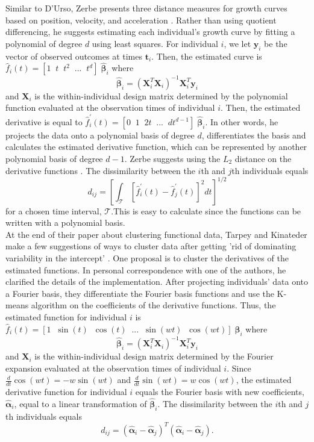 \documentclass[12pt]{article}
\newcommand{\B}[0]{\mathbf}
\newcommand{\bs}[0]{\boldsymbol}
\begin{document}
Similar to D'Urso, Zerbe presents three distance measures for growth curves based on position, velocity, and acceleration \cite{zerbe1979,schneiderman1993}. Rather than using quotient differencing, he suggests estimating each individual's growth curve by fitting a polynomial of degree $d$ using least squares. For individual $i$, we let $\B y_{i}$ be the vector of observed outcomes at times $\B t_{i}$. Then, the estimated curve is $\hat{f}_{i}(t) = [1\;\; t\;\;t^{2}\;\;...\;\;t^{d}]\;\hat{\bs\beta}_{i}$ where 
$$\hat{\bs\beta}_{i} = (\B X^{T}_{i}\B X_{i})^{-1}\B X^{T}_{i}\B y_{i}$$
and $\B X_{i}$ is the within-individual design matrix determined by the polynomial function evaluated at the observation times of individual $i$. Then, the estimated derivative is equal to
$\hat{f}_{i}^{'}(t) = [0\;\; 1\;\;2t\;\;...\;\;dt^{d-1}]\;\hat{\bs\beta}_{i}$. In other words, he projects the data onto a polynomial basis of degree $d$, differentiates the basis and calculates the estimated derivative function, which can be represented by another polynomial basis of degree $d-1$. Zerbe suggests using the $L_{2}$ distance on the derivative functions \cite{schneiderman1993}. The dissimilarity between the $i$th and $j$th individuals equals
$$d_{ij} =\left[ \int_{\mathcal{T}} [\hat{f}^{'}_{i}(t)-\hat{f}^{'}_{j}(t)]^{2}dt\right]^{1/2}$$
for a chosen time interval, $\mathcal{T}$.This is easy to calculate since the functions can be written with a polynomial basis.\\

At the end of their paper about clustering functional data, Tarpey and Kinateder make a few suggestions of ways to cluster data after getting 'rid of dominating variability in the intercept' \cite{tarpey2003}. One proposal is to cluster the derivatives of the estimated functions. In personal correspondence with one of the authors, he clarified the details of the implementation. After projecting individuals' data onto a Fourier basis, they differentiate the Fourier basis functions and use the K-means algorithm on the coefficients of the derivative functions. Thus, the estimated function for individual $i$ is $\hat{f}_{i}(t)= [1\;\; \sin(t)\;\;\cos(t)\;\;...\;\;\sin(wt)\;\;\cos(wt)]\;\hat{\bs\beta}_{i}$ where
$$\hat{\bs\beta}_{i} = (\B X^{T}_{i}\B X_{i})^{-1}\B X^{T}_{i}\B y_{i}$$
and $\B X_{i}$ is the within-individual design matrix determined by the Fourier expansion evaluated at the observation times of individual $i$. Since $\frac{d}{dt}\cos(wt) = -w\sin(wt)$ and $\frac{d}{dt}\sin(wt) = w\cos(wt)$, the estimated derivative function for individual $i$ equals the Fourier basis with new coefficients, $\hat{\bs\alpha}_{i}$, equal to a linear transformation of $\hat{\bs\beta}_{i}$. The dissimilarity between the $i$th and $j$th individuals equals
$$d_{ij} = (\hat{\bs\alpha}_{i}-\hat{\bs\alpha}_{j})^{T}(\hat{\bs\alpha}_{i}-\hat{\bs\alpha}_{j}).$$
\end{document}
